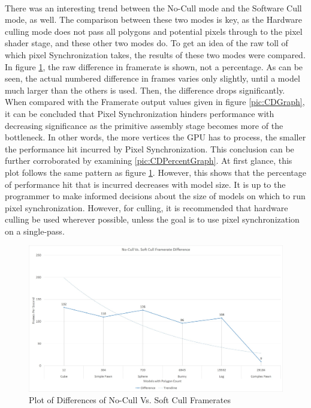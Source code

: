 \documentclass[a4paper, 12pt]{article}
\begin{document}
\noindent \\ There was an interesting trend between the No-Cull mode and the
Software Cull mode, as well. The comparison between these two modes is key, as
the Hardware culling mode does not pass all polygons and potential pixels
through to the pixel shader stage, and these other two modes do. To get an
idea of the raw toll of which pixel Synchronization takes, the results of
these two modes were compared. In figure \ref{pic:CDFrameDiff}, the raw
difference in framerate is shown, not a percentage. As can be seen, the actual
numbered difference in frames varies only slightly, until a model much larger
than the others is used. Then, the difference drops significantly. When
compared with the Framerate output values given in figure \ref{pic:CDGraph},
it can be concluded that Pixel Synchronization hinders performance with
decreasing significance as the primitive assembly stage becomes more of the
bottleneck. In other words, the more vertices the GPU has to process, the
smaller the performance hit incurred by Pixel Synchronization. This conclusion
can be further corroborated by examining \ref{pic:CDPercentGraph}. At first
glance, this plot follows the same pattern as figure \ref{pic:CDFrameDiff}.
However, this shows that the percentage of performance hit that is incurred
decreases with model size. It is up to the programmer to make informed
decisions about the size of models on which to run pixel synchronization.
However, for culling, it is recommended that hardware culling be used wherever
possible, unless the goal is to use pixel synchronization on a single-pass. 

\begin{figure}[!htb]
	\centering
	\includegraphics[width=1.0\textwidth]{CullDemoFrameDifference.jpg}
	\caption{Plot of Differences of No-Cull Vs. Soft Cull Framerates}
	\label{pic:CDFrameDiff}
\end{figure}
\end{document}
